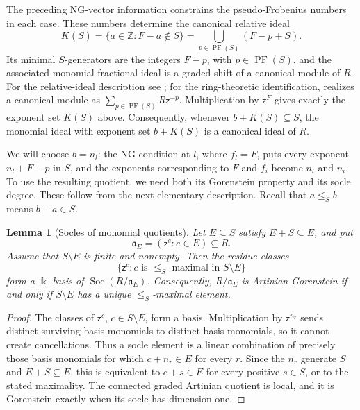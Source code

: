 \documentclass[10pt]{amsart}
\theoremstyle{plain}
\newtheorem{lemma}{Lemma}[section]
\begin{document}
The preceding NG-vector information constrains the pseudo-Frobenius
numbers in each case.  These numbers determine the canonical relative
ideal
\begin{equation}\label{eq:canonical-relative-ideal}
K(S)=\{a\in\mathbb Z:F-a\notin S\}
=\bigcup_{p\in\operatorname{PF}(S)}(F-p+S).
\end{equation}
Its minimal \(S\)-generators are the integers \(F-p\), with
\(p\in\operatorname{PF}(S)\), and the associated monomial fractional
ideal is a graded shift of a canonical module of \(R\).
For the relative-ideal description see \cite[\S1]{MS21}; for the
ring-theoretic identification, \cite[p.~593]{HW19} realizes a canonical
module as \(\sum_{p\in\operatorname{PF}(S)}R\mathsf z^{-p}\).
Multiplication by \(\mathsf z^F\) gives exactly the exponent set
\(K(S)\) above.  Consequently, whenever \(b+K(S)\subseteq S\), the
monomial ideal with exponent set \(b+K(S)\) is a canonical ideal of
\(R\).

We will choose \(b=n_l\): the NG condition at \(l\), where \(f_l=F\),
puts every exponent \(n_l+F-p\) in \(S\), and the exponents corresponding
to \(F\) and \(f_i\) become \(n_l\) and \(n_i\).
To use the resulting quotient, we need both its Gorenstein property and
its socle degree.  These follow from the next elementary description.
Recall that \(a\le_S b\) means \(b-a\in S\).

\begin{lemma}[Socles of monomial quotients]
\label{lem:monomial-socle}
Let \(E\subseteq S\) satisfy \(E+S\subseteq E\), and put
\[
\mathfrak a_E=(\mathsf z^e:e\in E)\subseteq R.
\]
Assume that \(S\setminus E\) is finite and nonempty.  Then the residue classes
\[
\bigl\{\mathsf z^c:
 c\text{ is }\le_S\text{-maximal in }S\setminus E\bigr\}
\]
form a \(\Bbbk\)-basis of
\(\operatorname{Soc}(R/\mathfrak a_E)\).  Consequently,
\(R/\mathfrak a_E\) is Artinian Gorenstein if and only if
\(S\setminus E\) has a unique \(\le_S\)-maximal element.
\end{lemma}

\begin{proof}
The classes of \(\mathsf z^c\), \(c\in S\setminus E\), form a basis.
Multiplication by \(\mathsf z^{n_r}\) sends distinct surviving basis
monomials to distinct basis monomials, so it cannot create cancellations.
Thus a socle element is a linear combination of precisely those basis
monomials for which \(c+n_r\in E\) for every \(r\).  Since the \(n_r\)
generate \(S\) and \(E+S\subseteq E\), this is equivalent to
\(c+s\in E\) for every positive \(s\in S\), or to the stated maximality.
The connected graded Artinian quotient is local, and it is Gorenstein
exactly when its socle has dimension one.
\end{proof}
\end{document}

